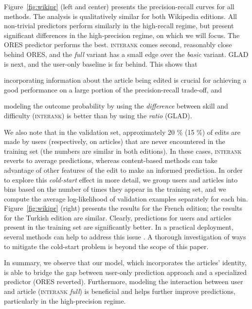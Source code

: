 \documentclass[format=sigconf]{acmart}
\begin{document}
Figure~\ref{fig:wikipr} (left and center) presents the precision-recall curves for all methods.
The analysis is qualitatively similar for both Wikipedia editions.
All non-trivial predictors perform similarly in the high-recall regime, but present significant differences in the high-precision regime, on which we will focus.
The ORES predictor performs the best.
\textsc{interank} comes second, reasonably close behind ORES, and the \emph{full} variant has a small edge over the \emph{basic} variant.
GLAD is next, and the user-only baseline is far behind.
This shows that
\begin{enuminline}
\item incorporating information about the article being edited is crucial for achieving a good performance on a large portion of the precision-recall trade-off, and
\item modeling the outcome probability by using the \emph{difference} between skill and difficulty (\textsc{interank}) is better than by using the \emph{ratio} (GLAD).
\end{enuminline}


We also note that in the validation set, approximately \num{20} \% (\num{15} \%) of edits are made by users (respectively, on articles) that are never encountered in the training set (the numbers are similar in both editions).
In these cases, \textsc{interank} reverts to average predictions, whereas content-based methods can take advantage of other features of the edit to make an informed prediction.
In order to explore this \emph{cold-start} effect in more detail, we group users and articles into bins based on the number of times they appear in the training set, and we compute the average log-likelihood of validation examples separately for each bin.
Figure~\ref{fig:wikipr} (right) presents the results for the French edition;
the results for the Turkish edition are similar.
Clearly, predictions for users and articles present in the training set are significantly better.
In a practical deployment, several methods can help to address this issue \citep{schein2002methods, lam2008addressing, levi2012finding}.
A thorough investigation of ways to mitigate the cold-start problem is beyond the scope of this paper.

In summary, we observe that our model, which incorporates the articles' identity, is able to bridge the gap between user-only prediction approach and a specialized predictor (ORES reverted).
Furthermore, modeling the interaction between user and article (\textsc{interank} \emph{full}) is beneficial and helps further improve predictions, particularly in the high-precision regime.
\end{document}
